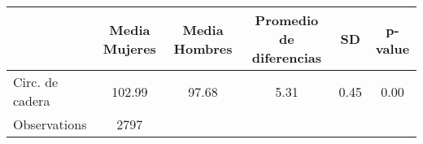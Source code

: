 {
\def\sym#1{\ifmmode^{#1}\else\(^{#1}\)\fi}
\begin{tabular}{l*{1}{ccccc}}
\hline\hline
                    &Media Mujeres&Media Hombres&Promedio de diferencias&          SD&     p-value\\
\hline
Circ. de cadera     &      102.99&       97.68&        5.31&        0.45&        0.00\\
\hline
Observations        &        2797&            &            &            &            \\
\hline\hline
\end{tabular}
}
